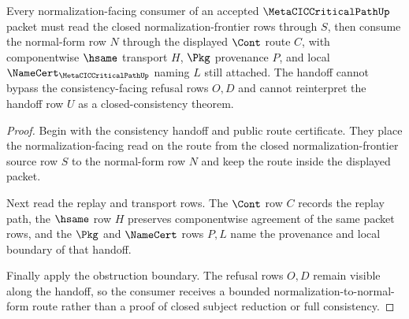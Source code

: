 \begin{theorem}
\label{thm:metacic-critical-path-normalization-consumer-handoff}
Every normalization-facing consumer of an accepted $\MetaCICCriticalPathUp$ packet must read the closed normalization-frontier rows through $S$, then consume the normal-form row $N$ through the displayed $\Cont$ route $C$, with componentwise $\hsame$ transport $H$, $\Pkg$ provenance $P$, and local $\NameCert_{\MetaCICCriticalPathUp}$ naming $L$ still attached. The handoff cannot bypass the consistency-facing refusal rows $O,D$ and cannot reinterpret the handoff row $U$ as a closed-consistency theorem.
\end{theorem}
\begin{proof}
Begin with the consistency handoff and public route certificate. They place the normalization-facing read on the route from the closed normalization-frontier source row $S$ to the normal-form row $N$ and keep the route inside the displayed packet.

Next read the replay and transport rows. The $\Cont$ row $C$ records the replay path, the $\hsame$ row $H$ preserves componentwise agreement of the same packet rows, and the $\Pkg$ and $\NameCert$ rows $P,L$ name the provenance and local boundary of that handoff.

Finally apply the obstruction boundary. The refusal rows $O,D$ remain visible along the handoff, so the consumer receives a bounded normalization-to-normal-form route rather than a proof of closed subject reduction or full consistency.
\end{proof}

